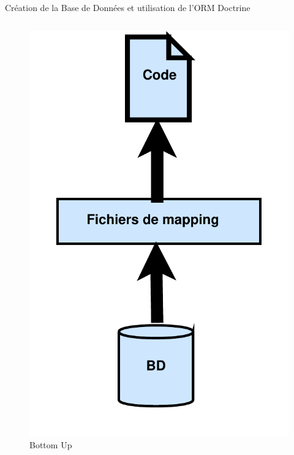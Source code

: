 \begin{frame}
\begin{block}{Création de la Base de Données et utilisation de l'ORM Doctrine}
\begin{columns}
			\begin{column}{4cm}
			\begin{figure}[!h]
				\begin{center}
					\includegraphics[scale=0.225]{images/bottomUp}
					\caption{Bottom Up}
				\end{center}
			\end{figure}
		\end{column}
	
	\end{columns}
	\end{block} 
\end{frame}




